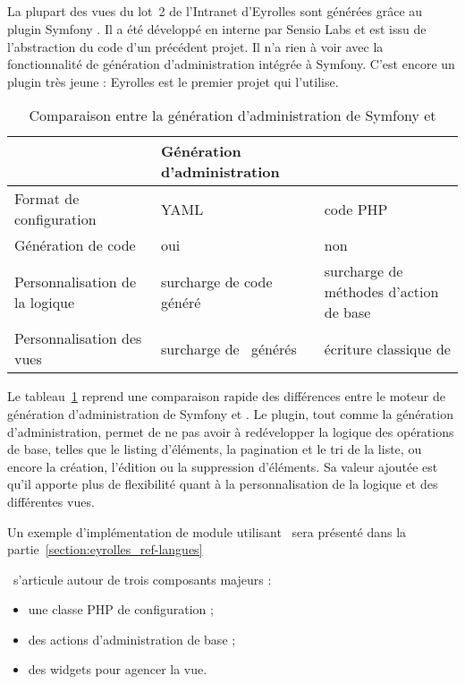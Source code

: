 \subsection{\asladmin}

La plupart des vues du lot~2 de l'Intranet d'Eyrolles sont générées grâce au plugin Symfony \asladmin. Il a été développé en interne par Sensio Labs et est issu de l'abstraction du code d'un précédent projet. Il n'a rien à voir avec la fonctionnalité de génération d'administration intégrée à Symfony. C'est encore un plugin très jeune : Eyrolles est le premier projet qui l'utilise.

\begin{table}
	\centering
	\begin{tabular}{|p{3cm}||p{4.5cm}|p{4.5cm}|}
		\hline
		& Génération d'administration & \asladmin\ \tabularnewline
		\hline
		\hline
		Format de configuration & YAML & code PHP \tabularnewline
		\hline
		Génération de code & oui & non \tabularnewline
		\hline
		Personnalisation de la logique & surcharge de code généré & surcharge de méthodes d'action de base \tabularnewline
		\hline
		Personnalisation des vues & surcharge de \apartials\ générés & écriture classique de \atemplates \tabularnewline
		\hline
	\end{tabular}
	\caption{Comparaison entre la génération d'administration de Symfony et \asladmin}
	\label{table:eyrolles_sladmin_sladmin-vs-admin-gen}
\end{table}

Le tableau~\ref{table:eyrolles_sladmin_sladmin-vs-admin-gen} reprend une comparaison rapide des différences entre le moteur de génération d'administration de Symfony et \asladmin. Le plugin, tout comme la génération d'administration, permet de ne pas avoir à redévelopper la logique des opérations de base, telles que le listing d'éléments, la pagination et le tri de la liste, ou encore la création, l'édition ou la suppression d'éléments. Sa valeur ajoutée est qu'il apporte plus de flexibilité quant à la personnalisation de la logique et des différentes vues.

Un exemple d'implémentation de module utilisant \asladmin\ sera présenté dans la partie~\ref{section:eyrolles_ref-langues}

\asladmin\ s'articule autour de trois composants majeurs :
\begin{itemize}
	\item une classe PHP de configuration ;
	\item des actions d'administration de base ;
	\item des widgets pour agencer la vue.
\end{itemize}


